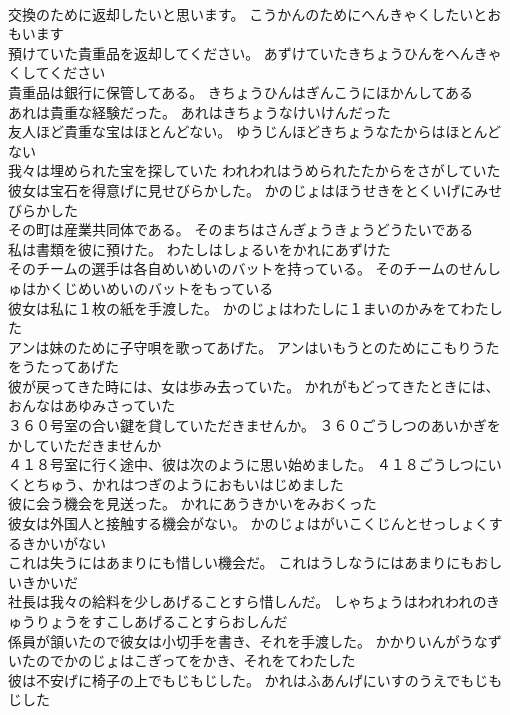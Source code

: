 \documentclass[8pt]{extreport}
\begin{document}
\begin{CJK}{UTF8}{min}
\\	交換のために返却したいと思います。	こうかんのためにへんきゃくしたいとおもいます 
\\	預けていた貴重品を返却してください。	あずけていたきちょうひんをへんきゃくしてください 
\\	貴重品は銀行に保管してある。	きちょうひんはぎんこうにほかんしてある 
\\	あれは貴重な経験だった。	あれはきちょうなけいけんだった 
\\	友人ほど貴重な宝はほとんどない。	ゆうじんほどきちょうなたからはほとんどない 
\\	我々は埋められた宝を探していた	われわれはうめられたたからをさがしていた 
\\	彼女は宝石を得意げに見せびらかした。	かのじょはほうせきをとくいげにみせびらかした 
\\	その町は産業共同体である。	そのまちはさんぎょうきょうどうたいである 
\\	私は書類を彼に預けた。	わたしはしょるいをかれにあずけた 
\\	そのチームの選手は各自めいめいのバットを持っている。	そのチームのせんしゅはかくじめいめいのバットをもっている 
\\	彼女は私に１枚の紙を手渡した。	かのじょはわたしに１まいのかみをてわたした 
\\	アンは妹のために子守唄を歌ってあげた。	アンはいもうとのためにこもりうたをうたってあげた 
\\	彼が戻ってきた時には、女は歩み去っていた。	かれがもどってきたときには、おんなはあゆみさっていた 
\\	３６０号室の合い鍵を貸していただきませんか。	３６０ごうしつのあいかぎをかしていただきませんか 
\\	４１８号室に行く途中、彼は次のように思い始めました。	４１８ごうしつにいくとちゅう、かれはつぎのようにおもいはじめました 
\\	彼に会う機会を見送った。	かれにあうきかいをみおくった 
\\	彼女は外国人と接触する機会がない。	かのじょはがいこくじんとせっしょくするきかいがない 
\\	これは失うにはあまりにも惜しい機会だ。	これはうしなうにはあまりにもおしいきかいだ 
\\	社長は我々の給料を少しあげることすら惜しんだ。	しゃちょうはわれわれのきゅうりょうをすこしあげることすらおしんだ 
\\	係員が頷いたので彼女は小切手を書き、それを手渡した。	かかりいんがうなずいたのでかのじょはこぎってをかき、それをてわたした 
\\	彼は不安げに椅子の上でもじもじした。	かれはふあんげにいすのうえでもじもじした 

\end{CJK}
\end{document}

